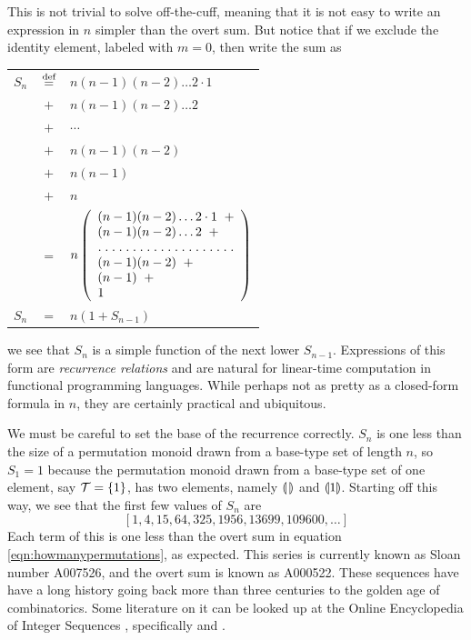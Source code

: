 This is not trivial to solve off-the-cuff, meaning that it is not easy to write an expression in $n$ simpler than the overt sum. But notice that if we exclude the identity element, labeled with $m=0$, then write the sum as
\begin{center}
\begin{tabular}{lcl}
    {$S_n$} & {$\overset{\text{def}}{=}$} & $n(n-1)(n-2)\ldots 2 \cdot 1$ \\
    {}      & $+$        & $n(n-1)(n-2)\ldots 2$ \\
    {}      & $+$        & $\cdots$ \\
    {}      & $+$        & $n(n-1)(n-2)$ \\
    {}      & $+$        & $n(n-1)$ \\
    {}      & $+$        & $n$ \\
    {}      & $=$        & $n\left(
                             \begin{array}{l}(n-1)(n-2)\ldots 2\cdot 1\;\;+\\
                                             (n-1)(n-2)\ldots 2\;\;+\\
                                              \hdotsfor[1.5]{1}\\
                                             (n-1)(n-2)\;\;+\\
                                             (n-1)\;\;+\\
                                             1
                             \end{array}\right)$\\
    {$S_n$} & $=$        & $n(1+S_{n-1})$
\end{tabular}
\end{center}
we see that $S_n$ is a simple function of the next lower $S_{n-1}$. Expressions of this form are \emph{recurrence relations} and are natural for linear-time computation in functional programming languages. While perhaps not as pretty as a closed-form formula in $n$, they are certainly practical and ubiquitous.


We must be careful to set the base of the recurrence correctly. $S_n$ is one less than the size of a permutation monoid drawn from a base-type set of length $n$, so $S_1=1$ because the permutation monoid drawn from a base-type set of one element, say $\mathcal{T}=\{1\}$, has two elements, namely $\llparenthesis\,\rrparenthesis$ and $\llparenthesis 1 \rrparenthesis$. Starting off this way, we see that the first few values of $S_n$ are
$$[1, 4, 15, 64, 325, 1956, 13699, 109600, \ldots]$$
Each term of this is one less than the overt sum in equation \ref{eqn:howmanypermutations}, as expected. This series is currently known as Sloan number A007526, and the overt sum is known as A000522. These sequences have have a long history going back more than three centuries to the golden age of combinatorics. Some literature on it can be looked up at the Online Encyclopedia of Integer Sequences \cite{oeis}, specifically \cite{A26} and \cite{A22}.


